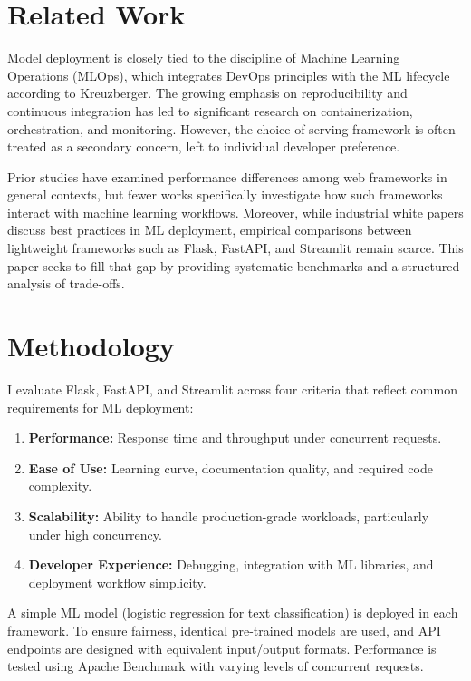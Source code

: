 \documentclass[12pt]{article}
\begin{document}
\section{Related Work}
Model deployment is closely tied to the discipline of Machine Learning Operations (MLOps), which integrates DevOps principles with the ML lifecycle according to \cite{Kreuzberger2023MLOps}Kreuzberger. The growing emphasis on reproducibility and continuous integration has led to significant research on containerization, orchestration, and monitoring. However, the choice of serving framework is often treated as a secondary concern, left to individual developer preference.

Prior studies have examined performance differences among web frameworks in general contexts, but fewer works specifically investigate how such frameworks interact with machine learning workflows. Moreover, while industrial white papers discuss best practices in ML deployment, empirical comparisons between lightweight frameworks such as Flask, FastAPI, and Streamlit remain scarce. This paper seeks to fill that gap by providing systematic benchmarks and a structured analysis of trade-offs.


\section{Methodology}
I evaluate Flask, FastAPI, and Streamlit across four criteria that reflect common requirements for ML deployment:

\begin{enumerate}
    \item \textbf{Performance:} Response time and throughput under concurrent requests.
    
    \item \textbf{Ease of Use:} Learning curve, documentation quality, and required code complexity.
    
    \item \textbf{Scalability:} Ability to handle production-grade workloads, particularly under high concurrency.
    
    \item \textbf{Developer Experience:} Debugging, integration with ML libraries, and deployment workflow simplicity.
\end{enumerate}

A simple ML model (logistic regression for text classification) is deployed in each framework. To ensure fairness, identical pre-trained models are used, and API endpoints are designed with equivalent input/output formats. Performance is tested using Apache Benchmark with varying levels of concurrent requests.
\end{document}
